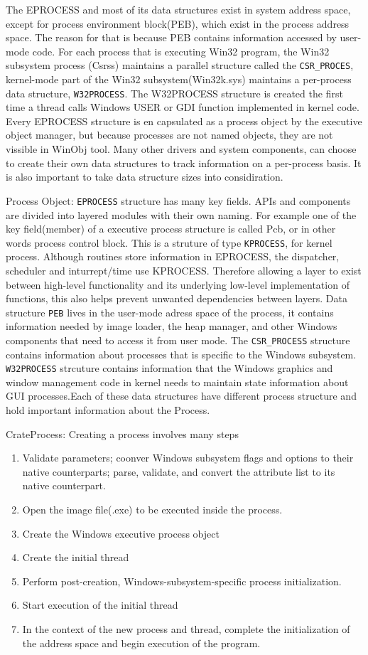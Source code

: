 \documentclass[letterpaper,10pt,draftclsnofoot,onecolumn]{IEEEtran}
\begin{document}
The EPROCESS and most of its data structures exist in system address space, except for process environment block(PEB), which exist in the process address space. The reason for that is because PEB contains information accessed by user-mode code. For each process that is executing Win32 program, the Win32 subsystem process (Csrss) maintains a parallel structure called the \verb|CSR_PROCES|, kernel-mode part of the Win32 subsystem(Win32k.sys) maintains a per-process data structure, \verb|W32PROCESS|. The W32PROCESS structure is created the first time a thread calls Windows USER or GDI function implemented in kernel code. Every EPROCESS structure is en capsulated as a process object by the executive object manager, but because processes are not named objects, they are not vissible in WinObj tool. Many other drivers and system components, can choose to create their own data structures to track information on a per-process basis. It is also important to take data structure sizes into considiration.

Process Object: \verb|EPROCESS| structure has many key fields. APIs and components are divided into layered modules with their own naming. For example one of the key field(member) of a executive process structure is called Pcb, or in other words process control block. This is a struture of type \verb|KPROCESS|, for kernel process. Although routines store information in EPROCESS, the dispatcher, scheduler and inturrept/time use KPROCESS. Therefore allowing a layer to exist between high-level functionality and its underlying low-level implementation of functions, this also helps prevent unwanted dependencies between layers. Data structure \verb|PEB| lives in the user-mode adress space of the process, it contains information needed by image loader, the heap manager, and other Windows components that need to access it from user mode. The \verb|CSR_PROCESS| structure contains information about processes that is specific to the Windows subsystem. \verb|W32PROCESS| strcuture contains information that the Windows graphics and window management code in kernel needs to maintain state information about GUI processes.Each of these data structures have different process structure and hold important information about the Process.

CrateProcess: Creating a process involves many steps
\begin{enumerate}
\item Validate parameters; coonver Windows subsystem flags and options to their native counterparts; parse, validate, and convert the attribute list to its native counterpart.
\item Open the image file(.exe) to be executed inside the process.
\item Create the Windows executive process object
\item Create the initial thread
\item Perform post-creation, Windows-subsystem-specific process initialization.
\item Start execution of the initial thread
\item In the context of the new process and thread, complete the initialization of the address space and begin execution of the program.
\end{enumerate}
\end{document}
